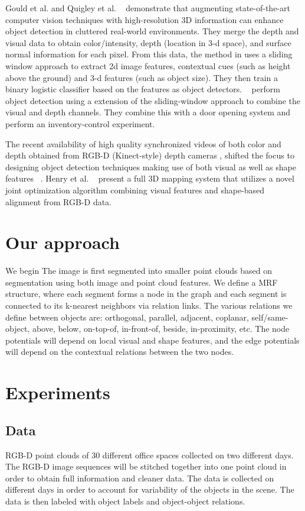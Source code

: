 \documentclass[11pt]{article} %
\begin{document}
   Gould et al.  \cite{gould:fusion} and Quigley et al. ~\cite{quigley:high-accuracy} demonstrate that augmenting state-of-the-art
   computer vision techniques with high-resolution 3D information can enhance object detection in cluttered real-world environments. 
   They merge the depth and visual data to obtain color/intensity, depth (location in 3-d space),  and surface normal information
   for each pixel. From this data, the method in \cite{gould:fusion} uses a sliding window approach to extract  2d image features, 
   contextual cues (such as height above the ground) and 3-d features (such as object size). They then train a binary logistic 
   classifier based on the features as object detectors. ~\cite{quigley:high-accuracy} perform object detection using a extension of 
   the sliding-window  approach to combine the visual and depth channels. They combine this with a door opening system and 
   perform an inventory-control experiment. 

   The recent availability of high quality synchronized videos of both color and depth obtained from RGB-D (Kinect-style) 
    depth cameras \cite{kinect}, shifted the focus to designing object detection techniques making use of both visual as well as 
    shape features ~\cite{lai:icra11a, lai:icra11b}. Henry et al. ~\cite{deter:rgbd} present a full 3D mapping system
    that utilizes a novel joint optimization algorithm combining visual features and shape-based alignment from RGB-D data.

\section{Our approach}
We begin 
The image is first segmented into smaller point clouds based on segmentation using both image and point cloud features. We define a
     MRF structure, where each segment forms a node in the graph and each segment is connected to its k-nearest neighbors via relation links.
     The various relations we define between objects are: orthogonal, parallel, adjacent, coplanar, self/same-object, above, below, on-top-of, 
     in-front-of, beside, in-proximity, etc. The node potentials will depend on local visual and shape features, and the edge potentials will depend 
     on the contextual relations between the two nodes.

     
   \section{Experiments}
   \subsection{Data}
     RGB-D point clouds of 30 different office spaces collected on two different days. The RGB-D image sequences will be stitched together
     into one point cloud in order to obtain full information and cleaner data. The data is collected on different days in order to account for 
     variability of the objects in the scene. The data is then labeled with object labels and object-object relations.


 
 \small
 

\end{document}
